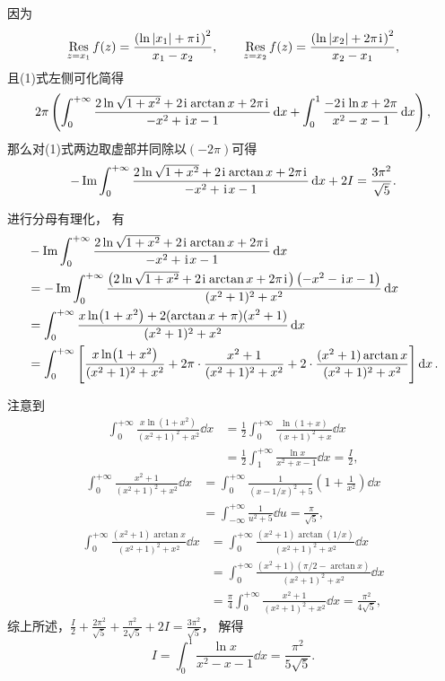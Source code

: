 \begin{example}
\begin{solution}
因为\begin{equation*}
	\operatorname*{Res}_{z=x_1} f(z)
	= \frac{\left(\ln\abs{x_1} + \pi\kern1pt\mathrm{i}\kern1pt\right)^2}{x_1 - x_2},
	\qquad
	\operatorname*{Res}_{z=x_2} f(z)
	= \frac{\left(\ln\abs{x_2} + 2\pi\kern1pt\mathrm{i}\kern1pt\right)^2}{x_2 - x_1},
\end{equation*}
且(1)式左侧可化简得\begin{align*}
	2\pi \left(
		\int_0^{+\infty} \frac{2\ln\sqrt{1+x^2} + 2\kern1pt\mathrm{i}\kern1pt \arctan x + 2\pi\kern1pt\mathrm{i}\kern1pt}{-x^2+\kern1pt\mathrm{i}\kern1pt x-1} \dd{x}
		+ \int_0^1 \frac{-2\kern1pt\mathrm{i}\kern1pt \ln x + 2\pi}{x^2-x-1} \dd{x}
	\right),
\end{align*}
那么对(1)式两边取虚部并同除以\((-2\pi)\)可得\begin{equation*}
	-\Im \int_0^{+\infty} \frac{2\ln\sqrt{1+x^2} + 2\kern1pt\mathrm{i}\kern1pt \arctan x + 2\pi\kern1pt\mathrm{i}\kern1pt}{-x^2+\kern1pt\mathrm{i}\kern1pt x-1} \dd{x}
	+ 2I = \frac{3\pi^2}{\sqrt{5}}.
\end{equation*}

进行分母有理化，
有\begin{align*}
	&-\Im \int_0^{+\infty} \frac{2\ln\sqrt{1+x^2} + 2\kern1pt\mathrm{i}\kern1pt \arctan x + 2\pi\kern1pt\mathrm{i}\kern1pt}{-x^2+\kern1pt\mathrm{i}\kern1pt x-1} \dd{x} \\
	&= -\Im \int_0^{+\infty} \frac{\left(2\ln\sqrt{1+x^2} + 2\kern1pt\mathrm{i}\kern1pt \arctan x + 2\pi\kern1pt\mathrm{i}\kern1pt\right) \left(-x^2-\kern1pt\mathrm{i}\kern1pt x-1\right)}{(x^2+1)^2+x^2} \dd{x} \\
	&= \int_0^{+\infty} \frac{x \ln(1+x^2) + 2(\arctan x + \pi) (x^2+1)}{(x^2+1)^2+x^2} \dd{x} \\
	&= \int_0^{+\infty} \left[
	\frac{x \ln(1+x^2)}{(x^2+1)^2+x^2}
	+ 2\pi \cdot \frac{x^2+1}{(x^2+1)^2+x^2}
	+ 2 \cdot \frac{(x^2+1) \arctan x}{(x^2+1)^2+x^2}
	\right] \dd{x}.
\end{align*}

注意到\begin{align*}
	\int_0^{+\infty} \frac{x \ln(1+x^2)}{(x^2+1)^2+x^2} \dd{x}
	&= \frac{1}{2} \int_0^{+\infty} \frac{\ln(1+x)}{(x+1)^2+x} \dd{x} \\
	&= \frac{1}{2} \int_1^{+\infty} \frac{\ln x}{x^2+x-1} \dd{x}
	= \frac{I}{2},
\end{align*}
\begin{align*}
	\int_0^{+\infty} \frac{x^2+1}{(x^2+1)^2+x^2} \dd{x}
	&= \int_0^{+\infty} \frac{1}{\left(x-1/x\right)^2+5} \left(1+\frac{1}{x^2}\right) \dd{x} \\
	&= \int_{-\infty}^{+\infty} \frac{1}{u^2+5} \dd{u}
	= \frac{\pi}{\sqrt{5}},
\end{align*}
\begin{align*}
	\int_0^{+\infty} \frac{(x^2+1) \arctan x}{(x^2+1)^2+x^2} \dd{x}
	&= \int_0^{+\infty} \frac{(x^2+1) \arctan(1/x)}{(x^2+1)^2+x^2} \dd{x} \\
	&= \int_0^{+\infty} \frac{(x^2+1) (\pi/2 - \arctan x)}{(x^2+1)^2+x^2} \dd{x} \\
	&= \frac{\pi}{4} \int_0^{+\infty} \frac{x^2+1}{(x^2+1)^2+x^2} \dd{x}
	= \frac{\pi^2}{4\sqrt{5}},
\end{align*}
综上所述，\(\frac{I}{2} + \frac{2\pi^2}{\sqrt{5}} + \frac{\pi^2}{2\sqrt{5}} + 2I
= \frac{3\pi^2}{\sqrt{5}}\)，
解得\begin{equation*}
	I = \int_0^1 \frac{\ln x}{x^2-x-1} \dd{x}
	= \frac{\pi^2}{5\sqrt{5}}.
\end{equation*}
\end{solution}
\end{example}
